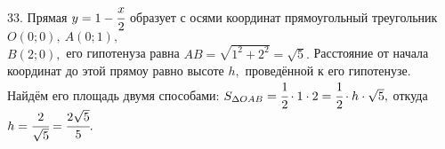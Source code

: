 33. Прямая $y=1-\cfrac{x}{2}$ образует с осями координат прямоугольный треугольник $O(0;0),\ A(0;1),$\\$ B(2;0),$ его гипотенуза равна $AB=\sqrt{1^2+2^2}=\sqrt{5}.$ Расстояние от начала координат до этой прямоу равно высоте $h,$ проведённой к его гипотенузе. Найдём его площадь двумя способами: $S_{\Delta OAB}=\cfrac{1}{2}\cdot1\cdot2=\cfrac{1}{2}\cdot h\cdot\sqrt{5},$ откуда $h=\cfrac{2}{\sqrt{5}}=\cfrac{2\sqrt{5}}{5}.$\\
